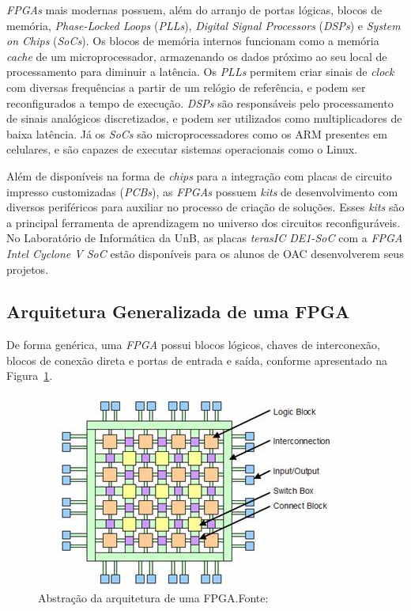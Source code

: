 { \textit{FPGAs} mais modernas possuem, além do arranjo de portas lógicas,
    blocos de memória, \textit{Phase-Locked Loops} (\textit{PLLs}),
    \textit{Digital Signal Processors} (\textit{DSPs}) e \textit{System on
    Chips} (\textit{SoCs}). Os blocos de memória internos funcionam como a memória
    \textit{cache} de um microprocessador, armazenando os dados próximo ao seu
    local de processamento para diminuir a latência. Os \textit{PLLs} permitem criar
    sinais de \textit{clock} com diversas frequências a partir de um relógio de
    referência, e podem ser reconfigurados a tempo de execução. \textit{DSPs}
    são responsáveis pelo processamento de sinais analógicos discretizados, e
    podem ser utilizados como multiplicadores de baixa latência. Já os
    \textit{SoCs} são microprocessadores como os ARM presentes em celulares,
    e são capazes de executar sistemas operacionais como o Linux.
}

{ Além de disponíveis na forma de \textit{chips} para a integração com placas
    de circuito impresso customizadas (\textit{PCBs}), as \textit{FPGAs} possuem
    \textit{kits} de desenvolvimento com diversos periféricos para auxiliar no
    processo de criação de soluções. Esses \textit{kits} são a principal ferramenta
    de aprendizagem no universo dos circuitos reconfiguráveis. No Laboratório de
    Informática da UnB, as placas \textit{terasIC DE1-SoC} com a \textit{FPGA
    Intel Cyclone V SoC} estão disponíveis para os alunos de OAC desenvolverem
    seus projetos.
}

    \subsection{Arquitetura Generalizada de uma FPGA}
    { De forma genérica, uma \textit{FPGA} possui blocos lógicos, chaves de
        interconexão, blocos de conexão direta e portas de entrada e saída,
        conforme apresentado na Figura~\ref{fig:fpga_general_arch}.
    }

    \begin{figure}[H]
    \centering
    \includegraphics[width=.7\linewidth]
        {../images/fpga_architecture_abstraction_-_olin_college.jpg}
        \caption[Abstração da arquitetura de uma FPGA]
            {Abstração da arquitetura de uma FPGA.\quad Fonte:~\cite{fpga_arch_abstraction}}
        \label{fig:fpga_general_arch}
    \end{figure}

